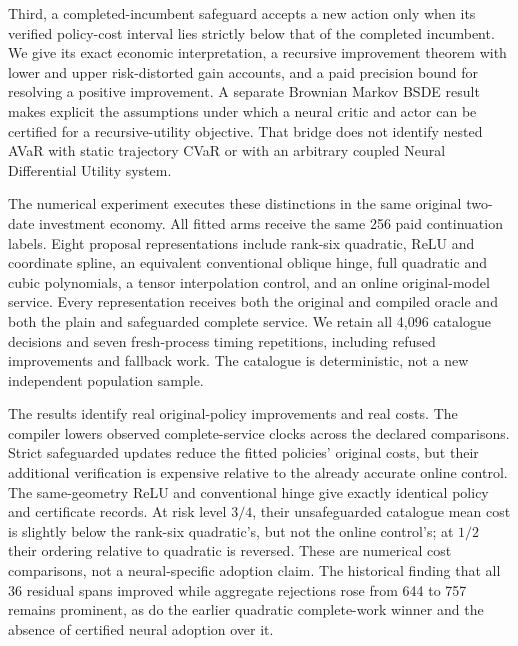 Third, a completed-incumbent safeguard accepts a new action only when its verified policy-cost interval lies strictly below that of the completed incumbent. We give its exact economic interpretation, a recursive improvement theorem with lower and upper risk-distorted gain accounts, and a paid precision bound for resolving a positive improvement. A separate Brownian Markov BSDE result makes explicit the assumptions under which a neural critic and actor can be certified for a recursive-utility objective. That bridge does not identify nested AVaR with static trajectory CVaR or with an arbitrary coupled Neural Differential Utility system.

The numerical experiment executes these distinctions in the same original two-date investment economy. All fitted arms receive the same 256 paid continuation labels. Eight proposal representations include rank-six quadratic, ReLU and coordinate spline, an equivalent conventional oblique hinge, full quadratic and cubic polynomials, a tensor interpolation control, and an online original-model service. Every representation receives both the original and compiled oracle and both the plain and safeguarded complete service. We retain all 4,096 catalogue decisions and seven fresh-process timing repetitions, including refused improvements and fallback work. The catalogue is deterministic, not a new independent population sample.

The results identify real original-policy improvements and real costs. The compiler lowers observed complete-service clocks across the declared comparisons. Strict safeguarded updates reduce the fitted policies' original costs, but their additional verification is expensive relative to the already accurate online control. The same-geometry ReLU and conventional hinge give exactly identical policy and certificate records. At risk level $3/4$, their unsafeguarded catalogue mean cost is slightly below the rank-six quadratic's, but not the online control's; at $1/2$ their ordering relative to quadratic is reversed. These are numerical cost comparisons, not a neural-specific adoption claim. The historical finding that all 36 residual spans improved while aggregate rejections rose from 644 to 757 remains prominent, as do the earlier quadratic complete-work winner and the absence of certified neural adoption over it.

